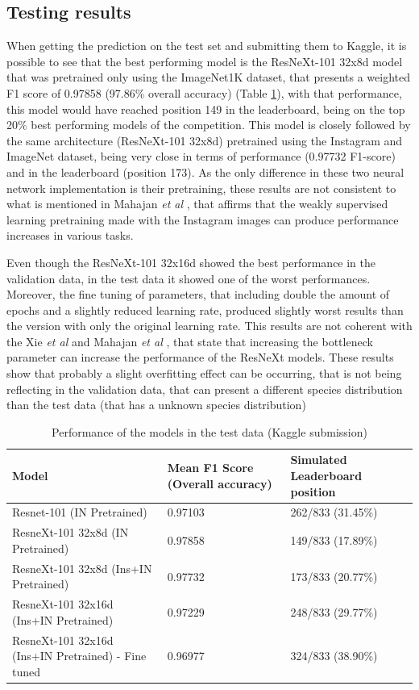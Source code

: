 \documentclass[10pt,onecolumn,titlepage,letterpaper]{article}
\begin{document}
\subsection{Testing results}

When getting the prediction on the test set and submitting them to Kaggle, it is possible to see that the best performing model is the ResNeXt-101 32x8d model that was pretrained only using the ImageNet1K dataset, that presents a weighted F1 score of 0.97858 (97.86\% overall accuracy) (Table \ref{table:test}), with that performance, this model would have reached position 149 in the leaderboard, being on the top 20\% best performing models of the competition. This model is closely followed by the same architecture (ResNeXt-101 32x8d) pretrained using the Instagram and ImageNet dataset, being very close in terms of performance (0.97732 F1-score) and in the leaderboard (position 173). As the only difference in these two neural network implementation is their pretraining, these results are not consistent to what is mentioned in Mahajan \textit{et al} \cite{Mahajan2018}, that affirms that the weakly supervised learning pretraining made with the Instagram images can produce performance increases in various tasks.

Even though the ResNeXt-101 32x16d showed the best performance in the validation data, in the test data it showed one of the worst performances. Moreover, the fine tuning of parameters, that including double the amount of epochs and a slightly reduced learning rate, produced slightly worst results than the version with only the original learning rate. This results are not coherent with the Xie \textit{et al}  \cite{Xie2017} and Mahajan \textit{et al} \cite{Mahajan2018}, that state that increasing the bottleneck parameter can increase the performance of the ResNeXt models. These results show that probably a slight overfitting effect can be occurring, that is not being reflecting in the validation data, that can present a different species distribution than the test data (that has a unknown species distribution) 

\begin{table}[h]
	\begin{center}
		\begin{tabular}{|p{9.1cm}|p{2.8cm}|p{2.8cm}|}
			\hline
			Model & Mean F1 Score (Overall accuracy) & Simulated Leaderboard position\\
			\hline\hline
			Resnet-101 (IN Pretrained) & 0.97103 & 262/833 (31.45\%) \\
			ResneXt-101 32x8d (IN Pretrained) & 0.97858 & 149/833 (17.89\%)  \\
			ResneXt-101 32x8d (Ins+IN Pretrained) & 0.97732 & 173/833 (20.77\%)   \\
			ResneXt-101 32x16d (Ins+IN Pretrained) & 0.97229 & 248/833 (29.77\%) \\
			ResneXt-101 32x16d (Ins+IN Pretrained) - Fine tuned & 0.96977 & 324/833 (38.90\%) \\
			\hline
		\end{tabular}
	\end{center}
	\caption{Performance of the models in the test data (Kaggle submission)}
	\label{table:test}
\end{table}
\end{document}
